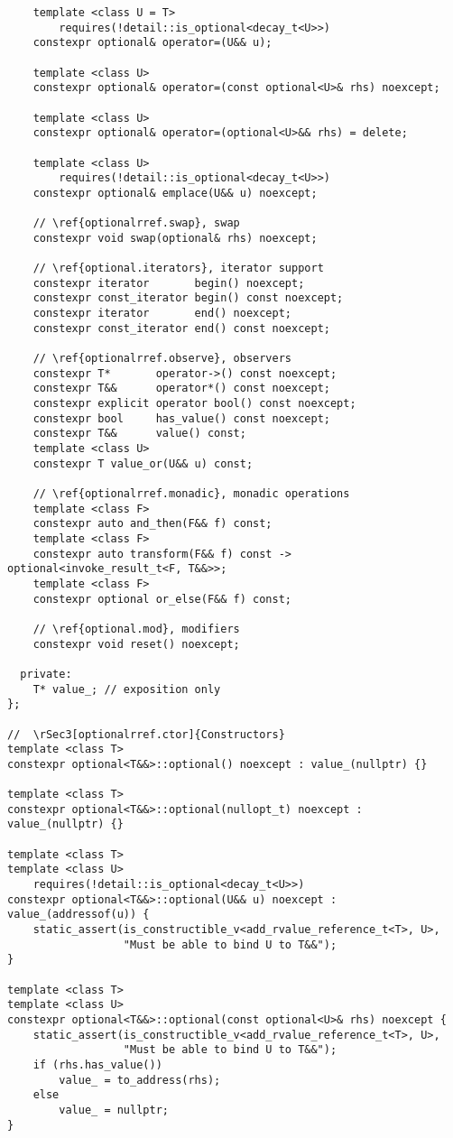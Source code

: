 \documentclass[a4paper,10pt,oneside,openany,final,article]{memoir}
\begin{document}
\begin{verbatim}
    template <class U = T>
        requires(!detail::is_optional<decay_t<U>>)
    constexpr optional& operator=(U&& u);

    template <class U>
    constexpr optional& operator=(const optional<U>& rhs) noexcept;

    template <class U>
    constexpr optional& operator=(optional<U>&& rhs) = delete;

    template <class U>
        requires(!detail::is_optional<decay_t<U>>)
    constexpr optional& emplace(U&& u) noexcept;

    // \ref{optionalrref.swap}, swap
    constexpr void swap(optional& rhs) noexcept;

    // \ref{optional.iterators}, iterator support
    constexpr iterator       begin() noexcept;
    constexpr const_iterator begin() const noexcept;
    constexpr iterator       end() noexcept;
    constexpr const_iterator end() const noexcept;

    // \ref{optionalrref.observe}, observers
    constexpr T*       operator->() const noexcept;
    constexpr T&&      operator*() const noexcept;
    constexpr explicit operator bool() const noexcept;
    constexpr bool     has_value() const noexcept;
    constexpr T&&      value() const;
    template <class U>
    constexpr T value_or(U&& u) const;

    // \ref{optionalrref.monadic}, monadic operations
    template <class F>
    constexpr auto and_then(F&& f) const;
    template <class F>
    constexpr auto transform(F&& f) const -> optional<invoke_result_t<F, T&&>>;
    template <class F>
    constexpr optional or_else(F&& f) const;

    // \ref{optional.mod}, modifiers
    constexpr void reset() noexcept;

  private:
    T* value_; // exposition only
};

//  \rSec3[optionalrref.ctor]{Constructors}
template <class T>
constexpr optional<T&&>::optional() noexcept : value_(nullptr) {}

template <class T>
constexpr optional<T&&>::optional(nullopt_t) noexcept : value_(nullptr) {}

template <class T>
template <class U>
    requires(!detail::is_optional<decay_t<U>>)
constexpr optional<T&&>::optional(U&& u) noexcept : value_(addressof(u)) {
    static_assert(is_constructible_v<add_rvalue_reference_t<T>, U>,
                  "Must be able to bind U to T&&");
}

template <class T>
template <class U>
constexpr optional<T&&>::optional(const optional<U>& rhs) noexcept {
    static_assert(is_constructible_v<add_rvalue_reference_t<T>, U>,
                  "Must be able to bind U to T&&");
    if (rhs.has_value())
        value_ = to_address(rhs);
    else
        value_ = nullptr;
}


\end{verbatim}
\end{document}

